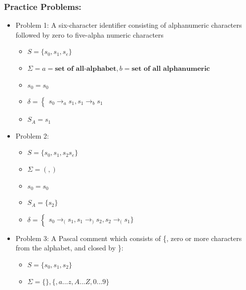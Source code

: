 \documentclass[20pt]{article}
\begin{document}
        \subsubsection*{Practice Problems:}
            \begin{itemize}
                \item Problem 1: A six-character identifier consisting of alphanumeric characters followed by zero to five-alpha numeric characters
                    \begin{itemize}
                        \item $S = \{s_0, s_1,s_e\}$ 
                        \item $\Sigma = {a = \textbf{set of all-alphabet},b = \textbf{set of all alphanumeric}}$
                        \item $s_0 = s_0$
                        \item $\delta = \begin{cases}
                            s_0 \rightarrow_a s_1, s_{1} \rightarrow_b s_{1}
                        \end{cases}$
                        \item $S_A = {s_1}$
                    \end{itemize}
                \item Problem 2: 
                    \begin{itemize}
                        \item $S = \{s_0, s_1,s_2 s_e\}$
                        \item $\Sigma  = {(,)}$
                        \item $s_0 = s_0$
                        \item $S_A = \{s_2\}$
                        \item $\delta = \begin{cases}
                            s_0\rightarrow_{(} s_1, s_1 \rightarrow_{)} s_2, s_2 \rightarrow_{(} s_1 \} 
                        \end{cases}$
                    \end{itemize}
                \item Problem 3: A Pascal comment which consists of \{, zero  or more characters from the alphabet, and closed by \}:
                  \begin{itemize}
                    \item $S = \{s_0, s_1,s_2\}$
                    \item $\Sigma = \{ \},\{,a...z,A...Z,0...9\}$

\end{itemize}
\end{itemize}
\end{document}
